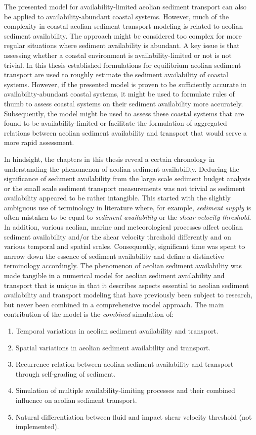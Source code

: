 The presented model for availability-limited aeolian sediment
transport can also be applied to availability-abundant coastal
systems. However, much of the complexity in coastal aeolian sediment
transport modeling is related to aeolian sediment availability. The
approach might be considered too complex for more regular situations
where sediment availability is abundant. A key issue is that assessing
whether a coastal environment is availability-limited or not is not
trivial. In this thesis established formulations for equilibrium
aeolian sediment transport are used to roughly estimate the sediment
availability of coastal systems. However, if the presented model is
proven to be sufficiently accurate in availability-abundant coastal
systems, it might be used to formulate rules of thumb to assess
coastal systems on their sediment availability more
accurately. Subsequently, the model might be used to assess these
coastal systems that are found to be availability-limited or
facilitate the formulation of aggregated relations between aeolian
sediment availability and transport that would serve a more rapid
assessment.

In hindsight, the chapters in this thesis reveal a certain chronology
in understanding the phenomenon of aeolian sediment availability.
Deducing the significance of sediment availability from the large
scale sediment budget analysis or the small scale sediment transport
measurements was not trivial as sediment availability appeared to be
rather intangible. This started with the slightly ambiguous use of
terminology in literature where, for example, \emph{sediment supply}
is often mistaken to be equal to \emph{sediment availability} or the
\emph{shear velocity threshold}. In addition, various aeolian, marine
and meteorological processes affect aeolian sediment availability
and/or the shear velocity threshold differently and on various
temporal and spatial scales. Consequently, significant time was spent
to narrow down the essence of sediment availability and define a
distinctive terminology accordingly. The phenomenon of aeolian
sediment availability was made tangible in a numerical model for
aeolian sediment availability and transport that is unique in that it
describes aspects essential to aeolian sediment availability and
transport modeling that have previously been subject to research, but
never been combined in a comprehensive model approach. The main
contribution of the model is the \emph{combined} simulation of:

\begin{enumerate}
\item Temporal variations in aeolian sediment availability and
  transport.
\item Spatial variations in aeolian sediment availability and
  transport.
\item Recurrence relation between aeolian sediment availability and
  transport through self-grading of sediment.
\item Simulation of multiple availability-limiting processes and their
  combined influence on aeolian sediment transport.
\item Natural differentiation between fluid and impact shear velocity
  threshold (not implemented).
\end{enumerate}

